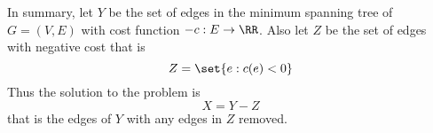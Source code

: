 \documentclass[11pt, oneside]{article}
\begin{document}
\begin{enumerate}
    In summary, let $Y$ be the set of edges in the minimum spanning tree of
    $G = (V, E)$ with cost function $-c:E \to \RR$.
    Also let $Z$ be the set of edges with negative cost that is
    \[
      Z = \set{e: c(e) < 0}
    \]
    Thus the solution to the problem is
    \[
      X = Y - Z
    \]
    that is the edges of $Y$ with any edges in $Z$ removed.
\end{enumerate}
\end{document}
